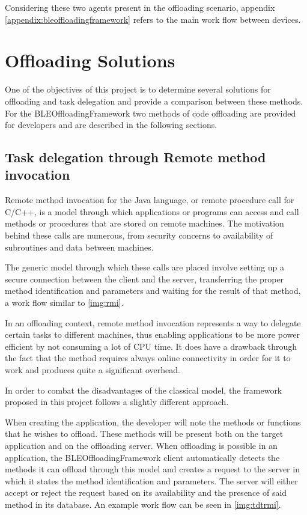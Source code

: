 	Considering these two agents present in the offloading scenario, appendix \ref{appendix:bleoffloadingframework} refers to the main work flow between devices.
	
\section{Offloading Solutions}
\label{offloadingsolutions}

	One of the objectives of this project is to determine several solutions for offloading and task delegation and provide a comparison between these methods. For the BLEOffloadingFramework two methods of code offloading are provided for developers and are described in the following sections.

\subsection{Task delegation through Remote method invocation}

	Remote method invocation \cite{downing1998java} for the Java language, or remote procedure call for C/C++, is a model through which applications or programs can access and call methods or procedures that are stored on remote machines. The motivation behind these calls are numerous, from security concerns to availability of subroutines and data between machines.
	
	The generic model through which these calls are placed involve setting up a secure connection between the client and the server, transferring the proper method identification and parameters and waiting for the result of that method, a work flow similar to \ref{img:rmi}.
	

	In an offloading context, remote method invocation represents a way to delegate certain tasks to different machines, thus enabling applications to be more power efficient by not consuming a lot of CPU time. It does have a drawback through the fact that the method requires always online connectivity in order for it to work and produces quite a significant overhead.
	
	In order to combat the disadvantages of the classical model, the framework proposed in this project follows a slightly different approach.
	
	When creating the application, the developer will note the methods or functions that he wishes to offload. These methods will be present both on the target application and on the offloading server. When offloading is possible in an application, the BLEOffloadingFramework client automatically detects the methods it can offload through this model and creates a request to the server in which it states the method identification and parameters. The server will either accept or reject the request based on its availability and the presence of said method in its database. An example work flow can be seen in \ref{img:tdtrmi}.
	
